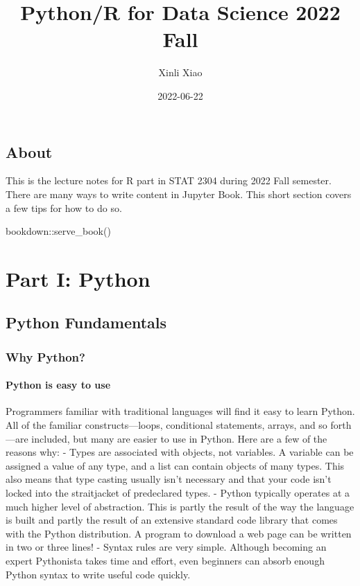 \documentclass[
]{book}
\title{Python/R for Data Science 2022 Fall}
\author{Xinli Xiao}
\date{2022-06-22}
\newenvironment{Shaded}{\begin{snugshade}}{\end{snugshade}}
\newcommand{\FunctionTok}[1]{\textcolor[rgb]{0.00,0.00,0.00}{#1}}
\newcommand{\NormalTok}[1]{#1}
\newcommand{\SpecialCharTok}[1]{\textcolor[rgb]{0.00,0.00,0.00}{#1}}
\begin{document}
\maketitle

{
\setcounter{tocdepth}{1}
\tableofcontents
}
\hypertarget{about}{%
\chapter*{About}\label{about}}

This is the lecture notes for R part in STAT 2304 during 2022 Fall semester.
There are many ways to write content in Jupyter Book. This short section
covers a few tips for how to do so.

\begin{Shaded}
\begin{Highlighting}[]
\NormalTok{bookdown}\SpecialCharTok{::}\FunctionTok{serve\_book}\NormalTok{()}
\end{Highlighting}
\end{Shaded}

\hypertarget{part-part-i-python}{%
\part*{Part I: Python}\label{part-part-i-python}}

\hypertarget{python-fundamentals}{%
\chapter{Python Fundamentals}\label{python-fundamentals}}

\hypertarget{why-python}{%
\section{Why Python?}\label{why-python}}

\hypertarget{python-is-easy-to-use}{%
\subsection{Python is easy to use}\label{python-is-easy-to-use}}

Programmers familiar with traditional languages will find it easy to learn Python. All of the familiar constructs---loops, conditional statements, arrays, and so forth---are included, but many are easier to use in Python. Here are a few of the reasons why:
- Types are associated with objects, not variables. A variable can be assigned a value of any type, and a list can contain objects of many types. This also means that type casting usually isn't necessary and that your code isn't locked into the straitjacket of predeclared types.
- Python typically operates at a much higher level of abstraction. This is partly the result of the way the language is built and partly the result of an extensive standard code library that comes with the Python distribution. A program to download a web page can be written in two or three lines!
- Syntax rules are very simple. Although becoming an expert Pythonista takes time
and effort, even beginners can absorb enough Python syntax to write useful
code quickly.
\end{document}
